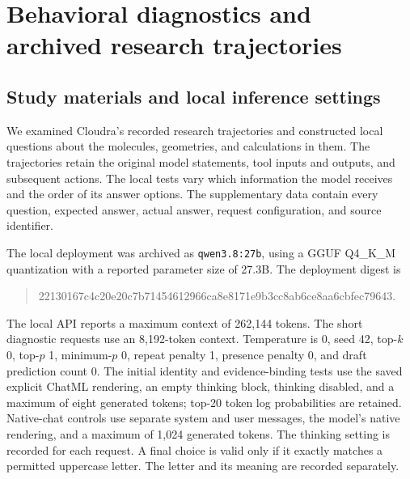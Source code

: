 \section{Behavioral diagnostics and archived research trajectories}
\label{sec:si-behavioral}

\subsection{Study materials and local inference settings}

We examined Cloudra's recorded research trajectories and constructed local questions about the molecules, geometries, and calculations in them. The trajectories retain the original model statements, tool inputs and outputs, and subsequent actions. The local tests vary which information the model receives and the order of its answer options. The supplementary data contain every question, expected answer, actual answer, request configuration, and source identifier.

The local deployment was archived as \texttt{qwen3.8:27b}, using a GGUF Q4\_K\_M quantization with a reported parameter size of 27.3B. The deployment digest is
\begin{quote}\small\ttfamily
22130167c4c20e20c7b71454612966ca8e8171e9b3cc8ab6ce8aa6cbfec79643.
\end{quote}
The local API reports a maximum context of 262,144 tokens. The short diagnostic requests use an 8,192-token context. Temperature is 0, seed 42, top-$k$ 0, top-$p$ 1, minimum-$p$ 0, repeat penalty 1, presence penalty 0, and draft prediction count 0. The initial identity and evidence-binding tests use the saved explicit ChatML rendering, an empty thinking block, thinking disabled, and a maximum of eight generated tokens; top-20 token log probabilities are retained. Native-chat controls use separate system and user messages, the model's native rendering, and a maximum of 1,024 generated tokens. The thinking setting is recorded for each request. A final choice is valid only if it exactly matches a permitted uppercase letter. The letter and its meaning are recorded separately.

